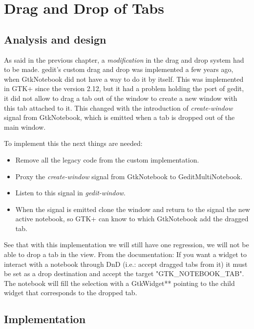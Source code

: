 
\chapter{Drag and Drop of Tabs}


\section{Analysis and design}

As said in the previous chapter, a \emph{modification} in the drag and drop system had to be made. gedit's custom drag and drop was implemented a few years ago, when GtkNotebook did not have a way to do it by itself. This was implemented in GTK+ since the version 2.12, but it had a problem holding the port of gedit, it did not allow to drag a tab out of the window to create a new window with this tab attached to it. This changed with the introduction of \emph{create-window} signal from GtkNotebook, which is emitted when a tab is dropped out of the main window.

To implement this the next things are needed:
\begin{itemize}
  \item Remove all the legacy code from the custom implementation.
  \item Proxy the \emph{create-window} signal from GtkNotebook to GeditMultiNotebook.
  \item Listen to this signal in \emph{gedit-window}.
  \item When the signal is emitted clone the window and return to the signal the new active notebook, so GTK+ can know to which GtkNotebook add the dragged tab.
\end{itemize}

See that with this implementation we will still have one regression, we will not be able to drop a tab in the view. From the documentation: If you want a widget to interact with a notebook through DnD (i.e.: accept dragged tabs from it) it must be set as a drop destination and accept the target "GTK\_NOTEBOOK\_TAB". The notebook will fill the selection with a GtkWidget** pointing to the child widget that corresponds to the dropped tab.

\section{Implementation}

